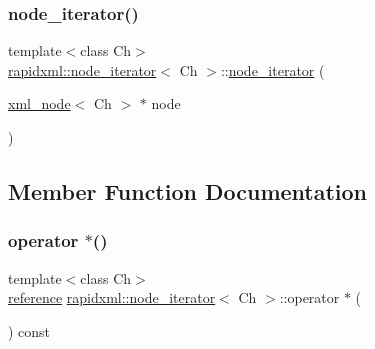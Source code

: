 \subsubsection{\texorpdfstring{node\_iterator()}{node\_iterator()}\hspace{0.1cm}{\footnotesize\ttfamily [2/2]}}
{\footnotesize\ttfamily template$<$class Ch$>$ \\
\mbox{\hyperlink{classrapidxml_1_1node__iterator}{rapidxml\+::node\+\_\+iterator}}$<$ Ch $>$\+::\mbox{\hyperlink{classrapidxml_1_1node__iterator}{node\+\_\+iterator}} (\begin{DoxyParamCaption}\item[{\mbox{\hyperlink{classrapidxml_1_1xml__node}{xml\+\_\+node}}$<$ Ch $>$ $\ast$}]{node }\end{DoxyParamCaption})\hspace{0.3cm}{\ttfamily [inline]}}



\subsection{Member Function Documentation}
\mbox{\label{classrapidxml_1_1node__iterator_ad0e779ea201861330ab1360f1a75cb7b}} 
\subsubsection{\texorpdfstring{operator $\ast$()}{operator *()}}
{\footnotesize\ttfamily template$<$class Ch$>$ \\
\mbox{\hyperlink{classrapidxml_1_1node__iterator_ad7fabbcb7d3d9e4e220299c5475b9e9c}{reference}} \mbox{\hyperlink{classrapidxml_1_1node__iterator}{rapidxml\+::node\+\_\+iterator}}$<$ Ch $>$\+::operator $\ast$ (\begin{DoxyParamCaption}{ }\end{DoxyParamCaption}) const\hspace{0.3cm}{\ttfamily [inline]}}

\mbox{\label{classrapidxml_1_1node__iterator_a20f1e25347d7e3856694f18597f7c8e2}} 
